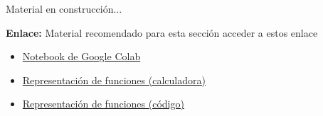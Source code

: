 \documentclass[a4,11pt]{aleph-notas}
\begin{document}
Material en construcción...
\begin{pycodigo}
    \textbf{Enlace:} Material recomendado para esta sección acceder a estos enlace
    \begin{itemize}
        \item 
        \href{https://colab.research.google.com/drive/1dtsJCBOb-2m2BGXqca7iavwkilENi69B?usp=sharing}{Notebook de Google Colab}
        \item 
        \href{https://colab.research.google.com/github/ECFM-PUCE/Python-Notebooks-Educativos/blob/main/Representacion-funciones-calculadora.ipynb}{Representación de funciones (calculadora)}
        \item 
        \href{https://colab.research.google.com/github/ECFM-PUCE/Python-Notebooks-Educativos/blob/main/Representacion-funciones-codigo.ipynb}{Representación de funciones (código)}
    \end{itemize}
\end{pycodigo}
\end{document}
